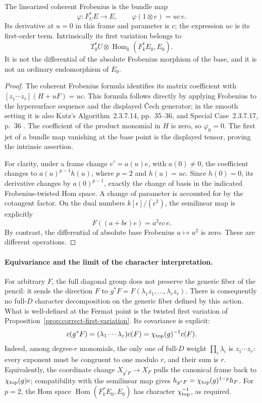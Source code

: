 \begin{proposition}
\label{prop:correct-first-variation}
The linearized coherent Frobenius is the bundle map
\[
 \varphi:F_U^*E\longrightarrow E,\qquad
 \varphi(1\otimes e)=uc\,e.
\]
Its derivative at $u=0$ in this frame and parameter is $c$;
the expression $uc$ is its first-order term.  Intrinsically its
first variation belongs to
\[
 T_0^*U\otimes\operatorname{Hom}_k(F_k^*E_0,E_0).
\]
It is not the differential of the absolute Frobenius morphism
of the base, and it is not an ordinary endomorphism of $E_0$.
\end{proposition}
\begin{proof}
The coherent Frobenius formula identifies its matrix coefficient
with $[z_1\cdots z_r](H+uF)=uc$.  This formula follows directly
by applying Frobenius to the hypersurface sequence and the displayed
\v Cech generator; in the smooth setting it is also Katz's
Algorithm~2.3.7.14, pp.~35--36, and Special Case~2.3.7.17,
p.~36 \citep{Katz1972}.  The coefficient of the product monomial in
$H$ is zero, so $\varphi_0=0$.  The first jet of a bundle map
vanishing at the base point is the displayed tensor, proving
the intrinsic assertion.

For clarity, under a frame change $e'=a(u)e$, with $a(0)\ne0$,
the coefficient changes to $a(u)^{p-1}h(u)$, where $p=2$ and
$h(u)=uc$.  Since $h(0)=0$, its derivative changes by
$a(0)^{p-1}$, exactly the change of basis in the indicated
Frobenius-twisted Hom space.  A change of parameter is accounted
for by the cotangent factor.  On the dual numbers
$k[\epsilon]/(\epsilon^2)$, the semilinear map is explicitly
\[
  F((a+b\epsilon)e)=a^2\epsilon c\,e.
\]
By contrast, the differential of absolute base Frobenius
$u\mapsto u^2$ is zero.  These are different operations.
\end{proof}

\paragraph{Equivariance and the limit of the character interpretation.}
For arbitrary $F$, the full diagonal group does not preserve
the generic fiber of the pencil: it sends the direction $F$ to
$g^*F=F(\lambda_1z_1,\ldots,\lambda_rz_r)$.
There is consequently no full-$D$ character decomposition on
the generic fiber defined by this action.  What is well-defined
at the Fermat point is the twisted first variation of
Proposition~\ref{prop:correct-first-variation}.
Its covariance is explicit:
\[
 c(g^*F)=(\lambda_1\cdots\lambda_r)c(F)
             =\chi_{\rm top}(g)^{-1}c(F).
\]
Indeed, among degree-$r$ monomials, the only one of full-$D$
weight $\prod_i\lambda_i$ is $z_1\cdots z_r$: every exponent
must be congruent to one modulo $r$, and their sum is $r$.
Equivalently, the coordinate change $X_{g^*F}\to X_F$ pulls
the canonical frame back to $\chi_{\rm top}(g)e$; compatibility
with the semilinear map gives
$h_{g^*F}=\chi_{\rm top}(g)^{1-p}h_F$.
For $p=2$, the Hom space
$\operatorname{Hom}(F_k^*E_0,E_0)$ has character
$\chi_{\rm top}^{-1}$, as required.

